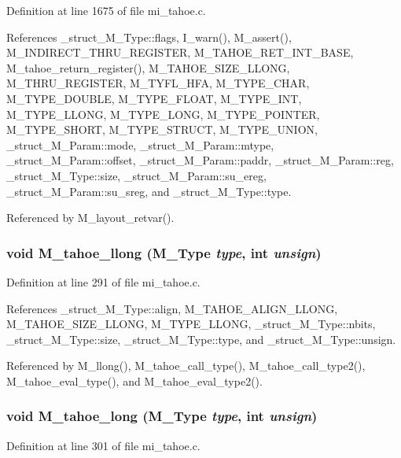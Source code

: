 Definition at line 1675 of file mi\_\-tahoe.c.

References \_\-struct\_\-M\_\-Type::flags, I\_\-warn(), M\_\-assert(), M\_\-INDIRECT\_\-THRU\_\-REGISTER, M\_\-TAHOE\_\-RET\_\-INT\_\-BASE, M\_\-tahoe\_\-return\_\-register(), M\_\-TAHOE\_\-SIZE\_\-LLONG, M\_\-THRU\_\-REGISTER, M\_\-TYFL\_\-HFA, M\_\-TYPE\_\-CHAR, M\_\-TYPE\_\-DOUBLE, M\_\-TYPE\_\-FLOAT, M\_\-TYPE\_\-INT, M\_\-TYPE\_\-LLONG, M\_\-TYPE\_\-LONG, M\_\-TYPE\_\-POINTER, M\_\-TYPE\_\-SHORT, M\_\-TYPE\_\-STRUCT, M\_\-TYPE\_\-UNION, \_\-struct\_\-M\_\-Param::mode, \_\-struct\_\-M\_\-Param::mtype, \_\-struct\_\-M\_\-Param::offset, \_\-struct\_\-M\_\-Param::paddr, \_\-struct\_\-M\_\-Param::reg, \_\-struct\_\-M\_\-Type::size, \_\-struct\_\-M\_\-Param::su\_\-ereg, \_\-struct\_\-M\_\-Param::su\_\-sreg, and \_\-struct\_\-M\_\-Type::type.

Referenced by M\_\-layout\_\-retvar().
\subsubsection{\setlength{\rightskip}{0pt plus 5cm}void M\_\-tahoe\_\-llong (\bf{M\_\-Type} {\em type}, int {\em unsign})}\label{m__tahoe_8h_8aabb6b608632e9da867309ea377ed47}




Definition at line 291 of file mi\_\-tahoe.c.

References \_\-struct\_\-M\_\-Type::align, M\_\-TAHOE\_\-ALIGN\_\-LLONG, M\_\-TAHOE\_\-SIZE\_\-LLONG, M\_\-TYPE\_\-LLONG, \_\-struct\_\-M\_\-Type::nbits, \_\-struct\_\-M\_\-Type::size, \_\-struct\_\-M\_\-Type::type, and \_\-struct\_\-M\_\-Type::unsign.

Referenced by M\_\-llong(), M\_\-tahoe\_\-call\_\-type(), M\_\-tahoe\_\-call\_\-type2(), M\_\-tahoe\_\-eval\_\-type(), and M\_\-tahoe\_\-eval\_\-type2().
\subsubsection{\setlength{\rightskip}{0pt plus 5cm}void M\_\-tahoe\_\-long (\bf{M\_\-Type} {\em type}, int {\em unsign})}\label{m__tahoe_8h_9c39825c0aa53b5debe3f2351ba74e15}




Definition at line 301 of file mi\_\-tahoe.c.

